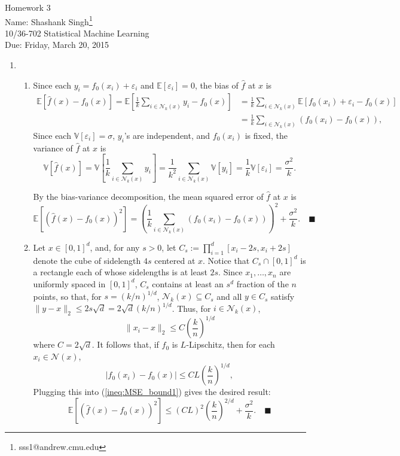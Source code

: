 \documentclass[11pt]{article}
\makeatletter
\newcommand{\myname}{Shashank Singh\footnote{sss1@andrew.cmu.edu}}
\newcommand{\myclass}{10/36-702 Statistical Machine Learning}
\newcommand{\myhwnum}{3}
\newcommand{\duedate}{Friday, March 20, 2015}
\renewcommand{\qed}{\quad \ensuremath{\blacksquare}}
\newcommand{\E}{\mathbb{E}} %
\newcommand{\Var}{\mathbb{V}} %
\newcommand{\e}{\varepsilon} %
\renewcommand{\hat}{\widehat}
\makeatother
\begin{document}
{\Large Homework \myhwnum} \\
Name: \myname \\
\myclass \\
Due: \duedate

\begin{enumerate}
\item
\begin{enumerate}
\item Since each $y_i = f_0(x_i) + \e_i$ and $\E[\e_i] = 0$, the bias of
$\hat f$ at $x$ is
\begin{align*}
\E\left[ \hat f(x) - f_0(x) \right]
    = \E\left[ \frac{1}{k} \sum_{i \in \mathscr{N}_k(x)} y_i - f_0(x) \right]
 &  = \frac{1}{k} \sum_{i \in \mathscr{N}_k(x)}
                                \E\left[ f_0(x_i) + \e_i - f_0(x) \right]   \\
 &  = \frac{1}{k} \sum_{i \in \mathscr{N}_k(x)}
                                            \left( f_0(x_i) - f_0(x) \right),
\end{align*}
Since each $\Var[\e_i] = \sigma$, $y_i$'s are independent, and $f_0(x_i)$ is
fixed, the variance of $\hat f$ at $x$ is
\[\Var[\hat f(x)]
    = \Var\left[ \frac{1}{k} \sum_{i \in \mathscr{N}_k(x)} y_i \right]
    = \frac{1}{k^2} \sum_{i \in \mathscr{N}_k(x)} \Var\left[ y_i \right]
    = \frac{1}{k} \Var\left[ \e_i \right]
    = \frac{\sigma^2}{k}.\]

By the bias-variance decomposition, the mean squared error of $\hat f$ at $x$
is
\begin{equation}
\E\left[ \left( \hat f(x) -  f_0(x) \right)^2 \right]
    = \left( \frac{1}{k} \sum_{i \in \mathscr{N}_k(x)}
                                    \left( f_0(x_i) - f_0(x) \right) \right)^2
    + \frac{\sigma^2}{k}. \qed
\label{ineq:MSE_bound1}
\end{equation}

\item Let $x \in [0,1]^d$, and, for any $s > 0$, let
$C_s := \prod_{i = 1}^d [x_i - 2s, x_i + 2s]$ denote the cube of sidelength
$4s$ centered at $x$. Notice that $C_s \cap [0,1]^d$ is a rectangle each of
whose sidelengths is at least $2s$. Since $x_1,\dots,x_n$ are uniformly spaced
in $[0,1]^d$, $C_s$ contains at least an $s^d$ fraction of the $n$ points, so
that, for $s = (k/n)^{1/d}$, $\mathscr{N}_k(x) \subseteq C_s$ and all
$y \in C_s$ satisfy
$\|y - x\|_2 \leq 2s\sqrt{d} = 2\sqrt{d}(k/n)^{1/d}$. Thus, for
$i \in \mathscr{N}_k(x)$,
\[\|x_i - x\|_2 \leq C\left( \frac{k}{n}\right)^{1/d}\]
where $C = 2\sqrt{d}$. It follows that, if $f_0$ is $L$-Lipschitz, then for
each $x_i \in \mathscr{N}(x)$,
\[|f_0(x_i) - f_0(x)| \leq CL\left( \frac{k}{n} \right)^{1/d},\]
Plugging this into (\ref{ineq:MSE_bound1}) gives the desired result:
\begin{equation}
\E\left[ \left( \hat f(x) - f_0(x) \right)^2 \right]
    \leq (CL)^2 \left( \frac{k}{n} \right)^{2/d} + \frac{\sigma^2}{k}. \qed
\label{ineq:MSE_bound2}
\end{equation}


\end{enumerate}
\end{enumerate}
\end{document}
